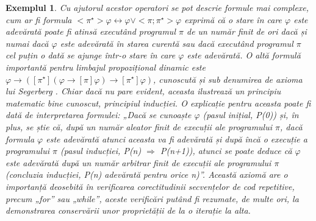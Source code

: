 \documentclass[12pt, openany]{book}
\newtheorem{example}[definition]{Exemplul} %
\begin{document}
\begin{example}
                Cu ajutorul acestor operatori se pot descrie formule mai complexe, cum ar fi formula $<\pi^\star>\varphi 
                \leftrightarrow \varphi \vee <\pi; \pi^\star>\varphi$ exprimă că o stare în care $\varphi$ este adevărată
                poate fi atinsă executând programul $\pi$ de un număr finit de ori dacă și numai dacă $\varphi$ este 
                adevărată în starea curentă sau dacă executând programul $\pi$ cel puțin o dată se ajunge într-o stare 
                în care $\varphi$ este adevărată. O altă formulă importantă pentru limbajul propozițional dinamic este
                $\varphi \rightarrow ([\pi^\star](\varphi \rightarrow [\pi]\varphi) \rightarrow [\pi^\star]\varphi)$, 
                cunoscută și sub denumirea de axioma lui Segerberg \cite{lecture_notes_hedin}. Chiar dacă nu pare 
                evident, aceasta ilustrează un principiu matematic bine cunoscut, principiul inducției. O explicație 
                pentru aceasta poate fi dată de interpretarea formulei: „Dacă se cunoaște $\varphi$ (pasul inițial, 
                P(0)) și, în plus, se știe că, după un număr aleator finit de execuții ale programului $\pi$, dacă 
                formula $\varphi$ este adevărată atunci aceasta va fi adevărată și după încă o execuție a programului 
                $\pi$ (pasul inducției, P(n) $\Rightarrow$ P(n+1)), atunci se poate deduce că $\varphi$ este 
                adevărată după un număr arbitrar finit de execuții ale programului $\pi$(concluzia inducției, P(n) 
                adevărată pentru orice n)”. Această axiomă are o importanță deosebită în verificarea corectitudinii 
                secvențelor de cod repetitive, precum „for” sau „while”, aceste verificări putând fi rezumate, de 
                multe ori, la demonstrarea conservării unor proprietății de la o iterație la alta.


\end{example}
\end{document}
